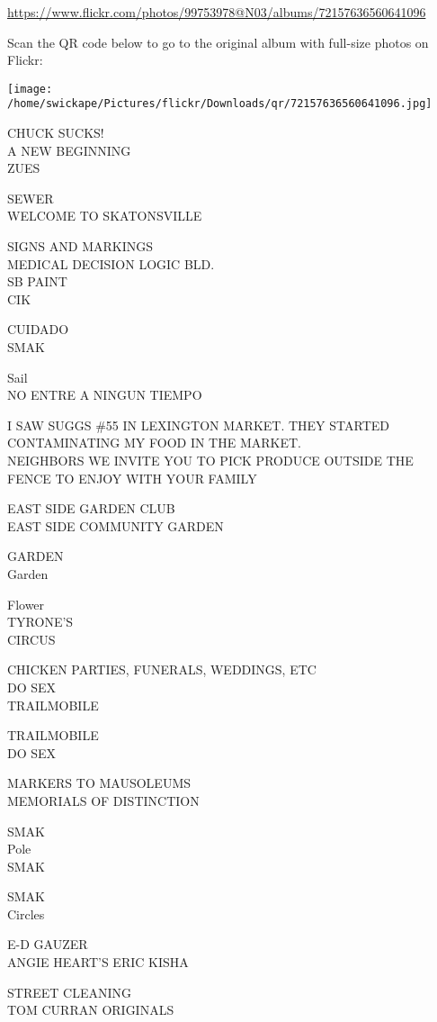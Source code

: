 \documentclass[10pt,letterpaper]{article}
\begin{document}
\url{https://www.flickr.com/photos/99753978@N03/albums/72157636560641096}

Scan the QR code below to go to the original album with full-size photos on Flickr:

\texttt{[image: /home/swickape/Pictures/flickr/Downloads/qr/72157636560641096.jpg]}


CHUCK SUCKS!\\
A NEW BEGINNING\\
ZUES

SEWER\\
WELCOME TO SKATONSVILLE

SIGNS AND MARKINGS\\
MEDICAL DECISION LOGIC BLD.\\
SB PAINT\\
CIK

CUIDADO\\
SMAK

Sail\\
NO ENTRE A NINGUN TIEMPO

I SAW SUGGS \#55 IN LEXINGTON MARKET.  THEY STARTED CONTAMINATING MY FOOD IN THE MARKET.\\
NEIGHBORS WE INVITE YOU TO PICK PRODUCE OUTSIDE THE FENCE TO ENJOY WITH YOUR FAMILY

EAST SIDE GARDEN CLUB\\
EAST SIDE COMMUNITY GARDEN

GARDEN\\
Garden

Flower\\
TYRONE'S\\
CIRCUS

CHICKEN PARTIES, FUNERALS, WEDDINGS, ETC\\
DO SEX\\
TRAILMOBILE

TRAILMOBILE\\
DO SEX

MARKERS TO MAUSOLEUMS\\
MEMORIALS OF DISTINCTION

SMAK\\
Pole\\
SMAK

SMAK\\
Circles

E{-}D GAUZER\\
ANGIE HEART'S ERIC KISHA

STREET CLEANING\\
TOM CURRAN ORIGINALS
\end{document}
